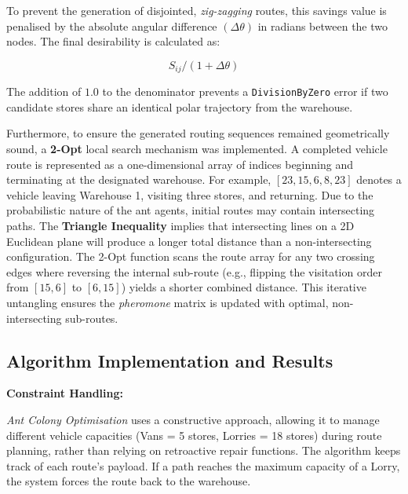 \documentclass[12pt, a4paper]{article}
\begin{document}
\hspace{-1.5em}To prevent the generation of disjointed, \textit{zig-zagging} routes, this savings value is penalised by the absolute angular difference $(\Delta\theta)$ in radians between the two nodes. The final desirability is calculated as:

$$S_{ij} / (1 + \Delta\theta)$$

\hspace{-1.5em}The addition of $1.0$ to the denominator prevents a \texttt{DivisionByZero} error if two candidate stores share an identical polar trajectory from the warehouse.

\vspace{0.5cm}

Furthermore, to ensure the generated routing sequences remained geometrically sound, a \textbf{2-Opt} local search mechanism was implemented. A completed vehicle route is represented as a one-dimensional array of indices beginning and terminating at the designated warehouse. For example, $[23, 15, 6, 8, 23]$ denotes a vehicle leaving Warehouse 1, visiting three stores, and returning. Due to the probabilistic nature of the ant agents, initial routes may contain intersecting paths. The \textbf{Triangle Inequality} implies that intersecting lines on a 2D Euclidean plane will produce a longer total distance than a non-intersecting configuration. The 2-Opt function scans the route array for any two crossing edges where reversing the internal sub-route (e.g., flipping the visitation order from $[15, 6]$ to $[6, 15]$) yields a shorter combined distance. This iterative untangling ensures the \textit{pheromone} matrix is updated with optimal, non-intersecting sub-routes.

\subsection{Algorithm Implementation and Results}

\vspace{0.5cm}

\textbf{Constraint Handling:}

\vspace{0.25cm}

\textit{Ant Colony Optimisation} uses a constructive approach, allowing it to manage different vehicle capacities (Vans = 5 stores, Lorries = 18 stores) during route planning,  rather than relying on retroactive repair functions. The algorithm keeps track of each route's payload. If a path reaches the maximum capacity of a Lorry, the system forces the route back to the warehouse.
\end{document}

